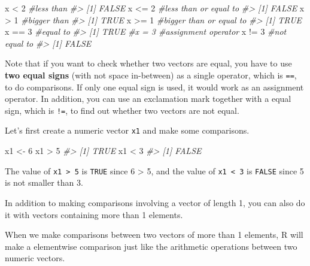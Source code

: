 \documentclass[
]{book}
\newenvironment{Shaded}{\begin{snugshade}}{\end{snugshade}}
\newcommand{\CommentTok}[1]{\textcolor[rgb]{0.56,0.35,0.01}{\textit{#1}}}
\newcommand{\DecValTok}[1]{\textcolor[rgb]{0.00,0.00,0.81}{#1}}
\newcommand{\NormalTok}[1]{#1}
\newcommand{\OtherTok}[1]{\textcolor[rgb]{0.56,0.35,0.01}{#1}}
\newcommand{\SpecialCharTok}[1]{\textcolor[rgb]{0.00,0.00,0.00}{#1}}
\begin{document}
\begin{Shaded}
\begin{Highlighting}[]
\NormalTok{x }\SpecialCharTok{\textless{}} \DecValTok{2}      \CommentTok{\#less than}
\CommentTok{\#\textgreater{} [1] FALSE}
\NormalTok{x }\SpecialCharTok{\textless{}=} \DecValTok{2}     \CommentTok{\#less than or equal to}
\CommentTok{\#\textgreater{} [1] FALSE}
\NormalTok{x }\SpecialCharTok{\textgreater{}} \DecValTok{1}      \CommentTok{\#bigger than}
\CommentTok{\#\textgreater{} [1] TRUE}
\NormalTok{x }\SpecialCharTok{\textgreater{}=} \DecValTok{1}     \CommentTok{\#bigger than or equal to}
\CommentTok{\#\textgreater{} [1] TRUE}
\NormalTok{x }\SpecialCharTok{==} \DecValTok{3}     \CommentTok{\#equal to}
\CommentTok{\#\textgreater{} [1] TRUE}
\CommentTok{\#x = 3     \#assignment operator}
\NormalTok{x }\SpecialCharTok{!=} \DecValTok{3}     \CommentTok{\#not equal to}
\CommentTok{\#\textgreater{} [1] FALSE}
\end{Highlighting}
\end{Shaded}

Note that if you want to check whether two vectors are equal, you have to use \textbf{two equal signs} (with not space in-between) as a single operator, which is \texttt{==}, to do comparisons. If only one equal sign is used, it would work as an assignment operator. In addition, you can use an exclamation mark together with a equal sign, which is \texttt{!=}, to find out whether two vectors are not equal.

Let's first create a numeric vector \texttt{x1} and make some comparisons.

\begin{Shaded}
\begin{Highlighting}[]
\NormalTok{x1 }\OtherTok{\textless{}{-}} \DecValTok{6}                  
\NormalTok{x1 }\SpecialCharTok{\textgreater{}} \DecValTok{5}
\CommentTok{\#\textgreater{} [1] TRUE}
\NormalTok{x1 }\SpecialCharTok{\textless{}} \DecValTok{3}
\CommentTok{\#\textgreater{} [1] FALSE}
\end{Highlighting}
\end{Shaded}

The value of \texttt{x1\ \textgreater{}\ 5} is \texttt{TRUE} since 6 \textgreater{} 5, and the value of \texttt{x1\ \textless{}\ 3} is \texttt{FALSE} since 5 is not smaller than 3.

In addition to making comparisons involving a vector of length 1, you can also do it with vectors containing more than 1 elements.

When we make comparisons between two vectors of more than 1 elements, R will make a elementwise comparison just like the arithmetic operations between two numeric vectors.
\end{document}
